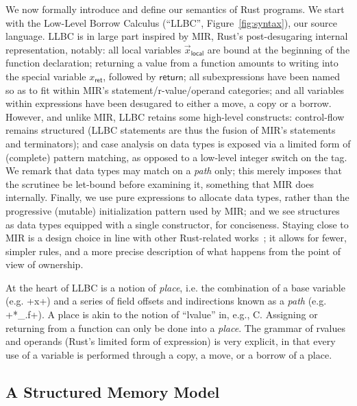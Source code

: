 \documentclass[acmsmall,screen]{acmart}
\newcommand{\fref}[1]{Figure~\ref{fig:#1}}
\newcommand\kw[1]{\ensuremath{\mathsf{#1}}}
\newcommand\ereturn{\kw{return}}
\begin{document}
We now formally introduce and define our semantics of Rust programs. We start
with the Low-Level Borrow Calculus (``LLBC'', \fref{syntax}), our source
language. LLBC is in large part inspired by MIR, Rust's post-desugaring internal
representation, notably: all local variables $\vec x_\mathsf{local}$ are bound at the beginning of the
function declaration; returning a value from a function amounts to writing into
the special variable $x_\mathsf{ret}$, followed by $\ereturn$; all subexpressions have been
named so as to fit within MIR's statement/r-value/operand categories; and all
variables within expressions have been desugared to either a move, a copy or a
borrow. %
However, and unlike MIR, LLBC retains some
high-level constructs: control-flow remains structured (LLBC statements are thus the
fusion of MIR's statements and terminators); and case analysis on data types
is exposed via a limited form of (complete) pattern matching, as opposed to a low-level integer switch on the
tag. We remark that data types may match on a \emph{path} only; this merely imposes that the
scrutinee be let-bound before examining it, something that MIR does internally.
Finally, we use pure expressions to allocate data types, rather than
the progressive (mutable) initialization pattern used by MIR; and we see structures as
data types equipped with a single constructor, for conciseness.
Staying close to MIR is a design choice in line with other Rust-related
works~\cite{jung2019stacked}; it allows for fewer, simpler
rules, and a more
precise description of what happens from the point of view of ownership.

At the heart of LLBC is a notion of \emph{place}, i.e. the combination of a base variable
(e.g. \li+x+) and a series of field offsets and indirections known as a
\emph{path} (e.g. \li+*_.f+). A place
is akin to the notion of ``lvalue'' in, e.g., C. Assigning or returning from a
function can only be done into a \emph{place}. The grammar of rvalues and
operands (Rust's limited form of expression) is very explicit, in that
every use of a variable is performed through a copy, a move, or a borrow of a place.


\subsection{A Structured Memory Model}
\end{document}
